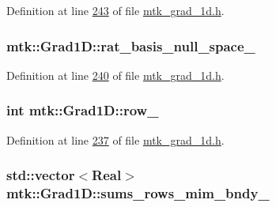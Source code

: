 Definition at line \hyperlink{mtk__grad__1d_8h_source_l00243}{243} of file \hyperlink{mtk__grad__1d_8h_source}{mtk\+\_\+grad\+\_\+1d.\+h}.

\hypertarget{classmtk_1_1Grad1D_a21a2941a03ae8fbf24d880660acf3db5}{
\subsubsection[{rat\+\_\+basis\+\_\+null\+\_\+space\+\_\+}]{ mtk\+::\+Grad1\+D\+::rat\+\_\+basis\+\_\+null\+\_\+space\+\_\+\hspace{0.3cm}{\ttfamily [private]}}}\label{classmtk_1_1Grad1D_a21a2941a03ae8fbf24d880660acf3db5}


Definition at line \hyperlink{mtk__grad__1d_8h_source_l00240}{240} of file \hyperlink{mtk__grad__1d_8h_source}{mtk\+\_\+grad\+\_\+1d.\+h}.

\hypertarget{classmtk_1_1Grad1D_a7947235d61d0dd27c5b81a81ca78d9a8}{
\subsubsection[{row\+\_\+}]{\setlength{\rightskip}{0pt plus 5cm}int mtk\+::\+Grad1\+D\+::row\+\_\+\hspace{0.3cm}{\ttfamily [private]}}}\label{classmtk_1_1Grad1D_a7947235d61d0dd27c5b81a81ca78d9a8}


Definition at line \hyperlink{mtk__grad__1d_8h_source_l00237}{237} of file \hyperlink{mtk__grad__1d_8h_source}{mtk\+\_\+grad\+\_\+1d.\+h}.

\hypertarget{classmtk_1_1Grad1D_ab8858a35339ed7036083d25b23293737}{
\subsubsection[{sums\+\_\+rows\+\_\+mim\+\_\+bndy\+\_\+}]{\setlength{\rightskip}{0pt plus 5cm}std\+::vector$<${\bf Real}$>$ mtk\+::\+Grad1\+D\+::sums\+\_\+rows\+\_\+mim\+\_\+bndy\+\_\+\hspace{0.3cm}{\ttfamily [private]}}}\label{classmtk_1_1Grad1D_ab8858a35339ed7036083d25b23293737}


